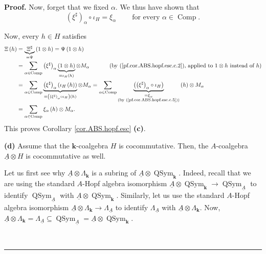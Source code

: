 \documentclass[numbers=enddot,12pt,final,onecolumn,notitlepage,abstracton]{scrartcl}%
\theoremstyle{definition}
\newenvironment{proof}[1][Proof]{\noindent\textbf{#1.} }{\ \rule{0.5em}{0.5em}}
\let\sumnonlimits\sum
\renewcommand{\sum}{\sumnonlimits\limits}
\begin{document}
\begin{proof}
Now, forget that we fixed $\alpha$. We thus have shown that%
\begin{equation}
\left(  \xi^{\sharp}\right)  _{\alpha}\circ\iota_{H}=\xi_{\alpha
}\ \ \ \ \ \ \ \ \ \ \text{for every }\alpha\in\operatorname*{Comp}.
\label{pf.cor.ABS.hopf.esc.c.5}%
\end{equation}


Now, every $h\in H$ satisfies%
\begin{align*}
\Xi\left(  h\right)   &  =\underbrace{\Xi^{\sharp}}_{=\Psi}\left(  1\otimes
h\right)  =\Psi\left(  1\otimes h\right) \\
&  =\sum_{\alpha\in\operatorname*{Comp}}\left(  \xi^{\sharp}\right)  _{\alpha
}\underbrace{\left(  1\otimes h\right)  }_{=\iota_{H}\left(  h\right)
}\otimes M_{\alpha}\ \ \ \ \ \ \ \ \ \ \left(  \text{by
(\ref{pf.cor.ABS.hopf.esc.c.2}), applied to }1\otimes h\text{ instead of
}h\right) \\
&  =\sum_{\alpha\in\operatorname*{Comp}}\underbrace{\left(  \xi^{\sharp
}\right)  _{\alpha}\left(  \iota_{H}\left(  h\right)  \right)  }_{=\left(
\left(  \xi^{\sharp}\right)  _{\alpha}\circ\iota_{H}\right)  \left(  h\right)
}\otimes M_{\alpha}=\sum_{\alpha\in\operatorname*{Comp}}\underbrace{\left(
\left(  \xi^{\sharp}\right)  _{\alpha}\circ\iota_{H}\right)  }_{\substack{=\xi
_{\alpha}\\\text{(by (\ref{pf.cor.ABS.hopf.esc.c.5}))}}}\left(  h\right)
\otimes M_{\alpha}\\
&  =\sum_{\alpha\in\operatorname*{Comp}}\xi_{\alpha}\left(  h\right)  \otimes
M_{\alpha}.
\end{align*}
This proves Corollary \ref{cor.ABS.hopf.esc} \textbf{(c)}.

\textbf{(d)} Assume that the $\mathbf{k}$-coalgebra $H$ is cocommutative.
Then, the $A$-coalgebra $\underline{A}\otimes H$ is cocommutative as well.

Let us first see why $\underline{A}\otimes\Lambda_{\mathbf{k}}$ is a subring
of $\underline{A}\otimes\operatorname*{QSym}\nolimits_{\mathbf{k}}$. Indeed,
recall that we are using the standard $A$-Hopf algebra isomorphism
$\underline{A}\otimes\operatorname*{QSym}\nolimits_{\mathbf{k}}\rightarrow
\operatorname*{QSym}\nolimits_{\underline{A}}$ to identify
$\operatorname*{QSym}\nolimits_{\underline{A}}$ with $\underline{A}%
\otimes\operatorname*{QSym}\nolimits_{\mathbf{k}}$. Similarly, let us use the
standard $A$-Hopf algebra isomorphism $\underline{A}\otimes\Lambda
_{\mathbf{k}}\rightarrow\Lambda_{\underline{A}}$ to identify $\Lambda
_{\underline{A}}$ with $\underline{A}\otimes\Lambda_{\mathbf{k}}$. Now,
$\underline{A}\otimes\Lambda_{\mathbf{k}}=\Lambda_{\underline{A}}%
\subseteq\operatorname*{QSym}\nolimits_{\underline{A}}=\underline{A}%
\otimes\operatorname*{QSym}\nolimits_{\mathbf{k}}$.


\end{proof}
\end{document}
